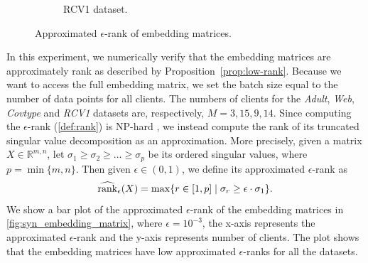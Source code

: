 \begin{figure}[t]
\begin{subfigure}{.24\textwidth}
      \caption{RCV1 dataset.}
      \label{fig:syn_embedding_matrix_rcv1}
    \end{subfigure}
    \caption{Approximated $\epsilon$-rank of embedding matrices.}
    \label{fig:syn_embedding_matrix}
\end{figure}

In this experiment, we numerically verify that the embedding matrices are approximately rank as described by Proposition~\ref{prop:low-rank}. Because we want to access the full embedding matrix, we set the batch size equal to the number of data points for all clients. The numbers of clients for the \emph{Adult}, \emph{Web}, \emph{Covtype} and \emph{RCV1} datasets are, respectively, $M = 3, 15, 9, 14$. Since computing the $\epsilon$-rank (\autoref{def:rank}) is NP-hard \cite{udell2019big}, we instead compute the rank of its truncated singular value decomposition as an approximation. More precisely, given a matrix $X \in \mathbb{R}^{m, n}$, let 
$\sigma_1 \geq \sigma_2 \geq \dots \geq \sigma_p$
be its ordered singular values, where $p = \min\{m,n\}$. Then given $\epsilon \in (0, 1)$, we define its approximated $\epsilon$-rank as 
\[\widehat {\operatorname{rank}}_\epsilon(X) = \max\{r \in [1, p] \mid \sigma_r \geq \epsilon \cdot \sigma_1\}.\]
We show a bar plot of the approximated $\epsilon$-rank of the embedding matrices in \autoref{fig:syn_embedding_matrix}, where $\epsilon=10^{-3}$, the x-axis represents the approximated $\epsilon$-rank and the y-axis represents number of clients. The plot shows that the embedding matrices have low approximated $\epsilon$-ranks for all the datasets.

